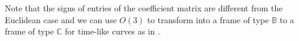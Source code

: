 \documentclass[a4paper]{amsart}
\theoremstyle{definition}
\theoremstyle{remark}
\newcommand{\BB}{\mathbb{B}}
\newcommand{\CC}{\mathbb{C}}
\newcommand{\hG}{G}
\newcommand{\bG}{\overline{G}}
\newcommand{\bX}{Y}
\renewcommand{\o}{\bm{0}}
\numberwithin{equation}{section}
\begin{document}
Note that the signs of entries of the coefficient matrix are different from the Euclidean case and we can use $O(3)$ to transform into a frame of type $\BB$ to a frame of type $\CC$ for time-like curves as in \cite{NN}.

\end{document}
